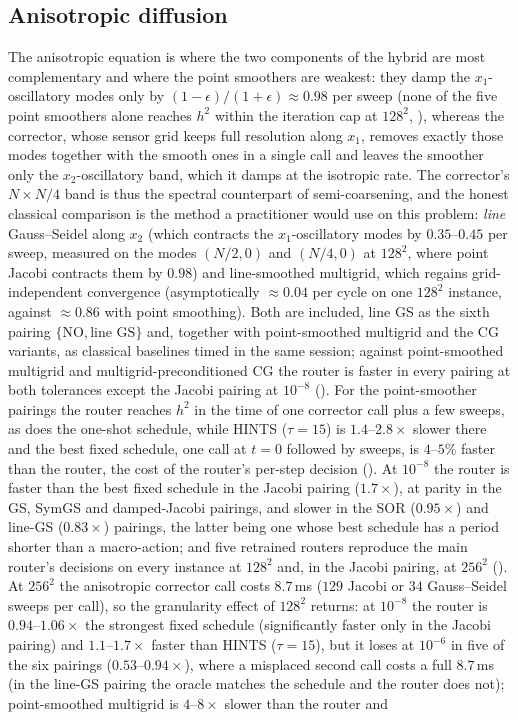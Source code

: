 \subsection{Anisotropic diffusion} \label{sec:wc_aniso}

The anisotropic equation is where the two components of the hybrid are most complementary and where the point smoothers are weakest: they damp the $x_1$-oscillatory modes only by $(1-\epsilon)/(1+\epsilon) \approx 0.98$ per sweep (none of the five point smoothers alone reaches $h^2$ within the iteration cap at $128^2$, ), whereas the corrector, whose sensor grid keeps full resolution along $x_1$, removes exactly those modes together with the smooth ones in a single call and leaves the smoother only the $x_2$-oscillatory band, which it damps at the isotropic rate. The corrector's $N \times N/4$ band is thus the spectral counterpart of semi-coarsening, and the honest classical comparison is the method a practitioner would use on this problem: \emph{line} Gauss--Seidel along $x_2$ (which contracts the $x_1$-oscillatory modes by $0.35$--$0.45$ per sweep, measured on the modes $(N/2, 0)$ and $(N/4, 0)$ at $128^2$, where point Jacobi contracts them by $0.98$) and line-smoothed multigrid, which regains grid-independent convergence (asymptotically $\approx 0.04$ per cycle on one $128^2$ instance, against $\approx 0.86$ with point smoothing). Both are included, line GS as the sixth pairing $\{\mathrm{NO}, \text{line GS}\}$ and, together with point-smoothed multigrid and the CG variants, as classical baselines timed in the same session; against point-smoothed multigrid and multigrid-preconditioned CG the router is faster in every pairing at both tolerances except the Jacobi pairing at $10^{-8}$ (). For the point-smoother pairings the router reaches $h^2$ in the time of one corrector call plus a few sweeps, as does the one-shot schedule, while HINTS ($\tau{=}15$) is $1.4$--$2.8\times$ slower there and the best fixed schedule, one call at $t=0$ followed by sweeps, is $4$--$5\%$ faster than the router, the cost of the router's per-step decision (). At $10^{-8}$ the router is faster than the best fixed schedule in the Jacobi pairing ($1.7\times$), at parity in the GS, SymGS and damped-Jacobi pairings, and slower in the SOR ($0.95\times$) and line-GS ($0.83\times$) pairings, the latter being one whose best schedule has a period shorter than a macro-action; and five retrained routers reproduce the main router's decisions on every instance at $128^2$ and, in the Jacobi pairing, at $256^2$ (). At $256^2$ the anisotropic corrector call costs $8.7$\,ms ($129$ Jacobi or $34$ Gauss--Seidel sweeps per call), so the granularity effect of $128^2$ returns: at $10^{-8}$ the router is $0.94$--$1.06\times$ the strongest fixed schedule (significantly faster only in the Jacobi pairing) and $1.1$--$1.7\times$ faster than HINTS ($\tau{=}15$), but it loses at $10^{-6}$ in five of the six pairings ($0.53$--$0.94\times$), where a misplaced second call costs a full $8.7$\,ms (in the line-GS pairing the oracle matches the schedule and the router does not); point-smoothed multigrid is $4$--$8\times$ slower than the router and 
